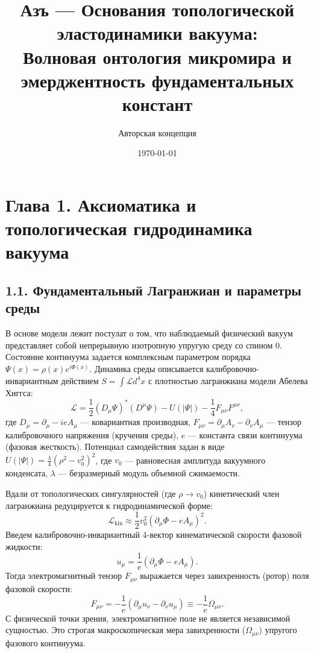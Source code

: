\documentclass[12pt,a4paper]{article}
\title{\textbf{Азъ — Основания топологической эластодинамики вакуума:\\ Волновая онтология микромира и эмерджентность фундаментальных констант}}
\author{Авторская концепция}
\date{\today}
\begin{document}
	
	\maketitle
	
	\section{Глава 1. Аксиоматика и топологическая гидродинамика вакуума}
	
	\subsection{1.1. Фундаментальный Лагранжиан и параметры среды}
	В основе модели лежит постулат о том, что наблюдаемый физический вакуум представляет собой непрерывную изотропную упругую среду со спином 0. Состояние континуума задается комплексным параметром порядка $\Psi(x) = \rho(x) e^{i\Phi(x)}$. Динамика среды описывается калибровочно-инвариантным действием $S = \int \mathcal{L} d^4x$ с плотностью лагранжиана модели Абелева Хиггса:
	\begin{equation}
		\mathcal{L} = \frac{1}{2} (D_\mu \Psi)^* (D^\mu \Psi) - U(|\Psi|) - \frac{1}{4} F_{\mu\nu} F^{\mu\nu},
		\label{eq:lagrangian}
	\end{equation}
	где $D_\mu = \partial_\mu - i e A_\mu$ — ковариантная производная, $F_{\mu\nu} = \partial_\mu A_\nu - \partial_\nu A_\mu$ — тензор калибровочного напряжения (кручения среды), $e$ — константа связи континуума (фазовая жесткость). Потенциал самодействия задан в виде $U(|\Psi|) = \frac{\lambda}{4} (\rho^2 - v_0^2)^2$, где $v_0$ — равновесная амплитуда вакуумного конденсата, $\lambda$ — безразмерный модуль объемной сжимаемости.
	
	Вдали от топологических сингулярностей (где $\rho \to v_0$) кинетический член лагранжиана редуцируется к гидродинамической форме:
	\begin{equation}
		\mathcal{L}_{\text{kin}} \approx \frac{1}{2} v_0^2 (\partial_\mu \Phi - e A_\mu)^2.
	\end{equation}
	Введем калибровочно-инвариантный 4-вектор кинематической скорости фазовой жидкости:
	\begin{equation}
		u_\mu = \frac{1}{e}(\partial_\mu \Phi - e A_\mu).
	\end{equation}
	Тогда электромагнитный тензор $F_{\mu\nu}$ выражается через завихренность (ротор) поля фазовой скорости:
	\begin{equation}
		F_{\mu\nu} = -\frac{1}{e} (\partial_\mu u_\nu - \partial_\nu u_\mu) \equiv -\frac{1}{e} \Omega_{\mu\nu}.
		\label{eq:vorticity}
	\end{equation}
	С физической точки зрения, электромагнитное поле не является независимой сущностью. Это строгая макроскопическая мера завихренности ($\Omega_{\mu\nu}$) упругого фазового континуума.
	
\end{document}
